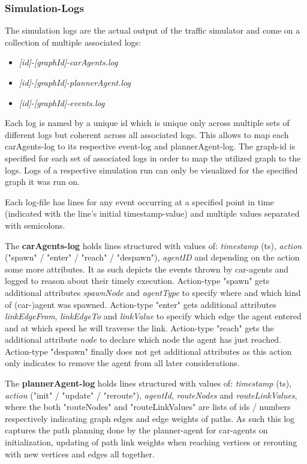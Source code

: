 \subsubsection{Simulation-Logs}

The simulation logs are the actual output of the traffic simulator and come on a collection of multiple associated logs: 

\begin{itemize}
    \item \textit{[id]-[graphId]-carAgents.log}
    \item \textit{[id]-[graphId]-plannerAgent.log}
    \item \textit{[id]-[graphId]-events.log}
\end{itemize}

Each log is named by a unique id which is unique only across multiple sets of different logs but coherent across all associated logs. This allows to map each carAgents-log to its respective event-log and plannerAgent-log.
The graph-id is specified for each set of associated logs in order to map the utilized graph to the logs. Logs of a respective simulation run can only be visualized for the specified graph it was run on.

Each log-file has lines for any event occurring at a specified point in time (indicated with the line's initial timestamp-value) and multiple values separated with semicolons.

The \textbf{carAgents-log} holds lines structured with values of: \textit{timestamp} (ts), \textit{action} ("spawn" / "enter" / "reach" / "despawn"), \textit{agentID} and depending on the action some more attributes. It as such depicts the events thrown by car-agents and logged to reason about their timely execution.
Action-type "spawn" gets additional attributes \textit{spawnNode} and \textit{agentType} to specify where and which kind of (car-)agent was spawned. 
Action-type "enter" gets additional attributes \textit{linkEdgeFrom}, \textit{linkEdgeTo} and \textit{linkValue} to specify which edge the agent entered and at which speed he will traverse the link.
Action-type "reach" gets the additional attribute \textit{node} to declare which node the agent has just reached.
Action-type "despawn" finally does not get additional attributes as this action only indicates to remove the agent from all later considerations.

The \textbf{plannerAgent-log} holds lines structured with values of: \textit{timestamp} (ts), \textit{action} ("init" / "update" / "reroute"), \textit{agentId}, \textit{routeNodes} and \textit{routeLinkValues}, where the both "routeNodes" and "routeLinkValues" are lists of ids / numbers respectively indicating graph edges and edge weights of paths. As such this log captures the path planning done by the planner-agent for car-agents on initialization, updating of path link weights when reaching vertices or rerouting with new vertices and edges all together.

